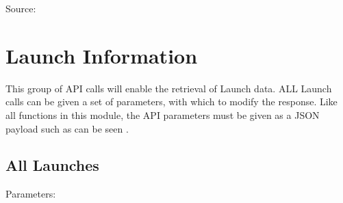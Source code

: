 \documentclass[letterpaper,10pt,english]{sphinxmanual}
\begin{document}

\noindent{}

Source:  


\chapter{Launch Information}
\label{\detokenize{details/launches:launch-information}}\label{\detokenize{details/launches::doc}}
This group of API calls will enable the retrieval of Launch data.
ALL Launch calls can be given a set of parameters, with which to modify the response.
Like all functions in this module, the API parameters must be given as a JSON payload such as can be seen .


\section{All Launches}
\label{\detokenize{details/launches:all-launches}}
\begin{sphinxVerbatim}[commandchars=\\\{\}]
  
\end{sphinxVerbatim}

Parameters:
\end{document}
